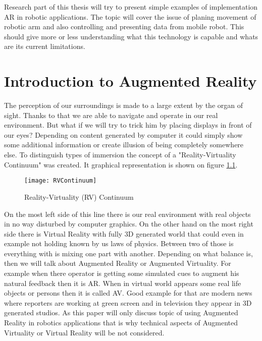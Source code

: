 \documentclass[printmode,en]{mgr}
\begin{document}
Research part of this thesis will try to present simple examples of implementation AR in robotic applications. The topic will cover the issue of planing movement of robotic arm and also controlling and presenting data from mobile robot. This should give more or less understanding what this technology is capable and whats are its current limitations.


\chapter{Introduction to Augmented Reality}
The perception of our surroundings is made to a large extent by the organ of sight. Thanks to that we are able to navigate and operate in our real environment. But what if we will try to trick him by placing displays in front of our eyes? Depending on content generated by computer it could simply show some additional information or create illusion of being completely somewhere else. To distinguish types of immersion the concept of a "Reality-Virtuality Continuum" \cite{RVContinuum} was created. It graphical representation is shown on figure \ref{fig:RVContinuum}.

\begin{figure}[!ht]
  \centering
    \texttt{[image: RVContinuum]}
  \caption{Reality-Virtuality (RV) Continuum \cite{RVContinuum}}
  \label{fig:RVContinuum}
\end{figure}

On the most left side of this line there is our real environment with real objects in no way disturbed by computer graphics. On the other hand on the most right side there is Virtual Reality with fully 3D generated world that could even in example not holding known by us laws of physics. Between two of those is everything with is mixing one part with another. Depending on what balance is, then we will talk about Augmented Reality or Augmented Virtuality. For example when there operator is getting some simulated cues to augment his natural feedback then it is AR. When in virtual world appears some real life objects or persons then it is called AV. Good example for that are modern news where reporters are working at green screen and in television they appear in 3D generated studios. As this paper will only discuss topic of using Augmented Reality in robotics applications that is why technical aspects of Augmented Virtuality or Virtual Reality will be not considered.
\end{document}
